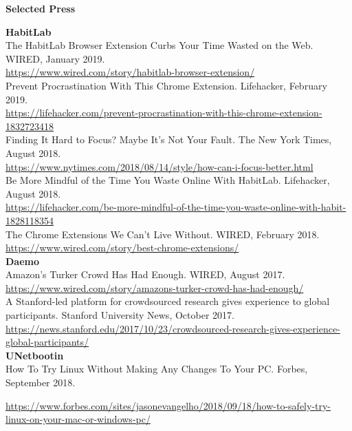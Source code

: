 \documentclass[10pt,A4]{article}
\newcommand{\cvsection}[1]
{
	\begin{center}
		\large\textcolor{sectcol}{\textbf{#1}}
	\end{center}
}
\begin{document}
\cvsection{Selected Press}

\textbf{HabitLab}\\

The HabitLab Browser Extension Curbs Your Time Wasted on the Web. WIRED, January 2019.\\
\url{https://www.wired.com/story/habitlab-browser-extension/}\\

Prevent Procrastination With This Chrome Extension. Lifehacker, February 2019.\\
\url{https://lifehacker.com/prevent-procrastination-with-this-chrome-extension-1832723418}\\

Finding It Hard to Focus? Maybe It’s Not Your Fault. The New York Times, August 2018.\\
\url{https://www.nytimes.com/2018/08/14/style/how-can-i-focus-better.html}\\

Be More Mindful of the Time You Waste Online With HabitLab. Lifehacker, August 2018.\\
\url{https://lifehacker.com/be-more-mindful-of-the-time-you-waste-online-with-habit-1828118354}\\

The Chrome Extensions We Can't Live Without. WIRED, February 2018.\\
\url{https://www.wired.com/story/best-chrome-extensions/}\\

\textbf{Daemo}\\

Amazon's Turker Crowd Has Had Enough. WIRED, August 2017.\\
\url{https://www.wired.com/story/amazons-turker-crowd-has-had-enough/}\\

A Stanford-led platform for crowdsourced research gives experience to global participants. Stanford University News, October 2017.\\
\url{https://news.stanford.edu/2017/10/23/crowdsourced-research-gives-experience-global-participants/}\\

\textbf{UNetbootin}\\

How To Try Linux Without Making Any Changes To Your PC. Forbes, September 2018.\\
\begin{small}
\url{https://www.forbes.com/sites/jasonevangelho/2018/09/18/how-to-safely-try-linux-on-your-mac-or-windows-pc/}
\end{small}\\
\end{document}
